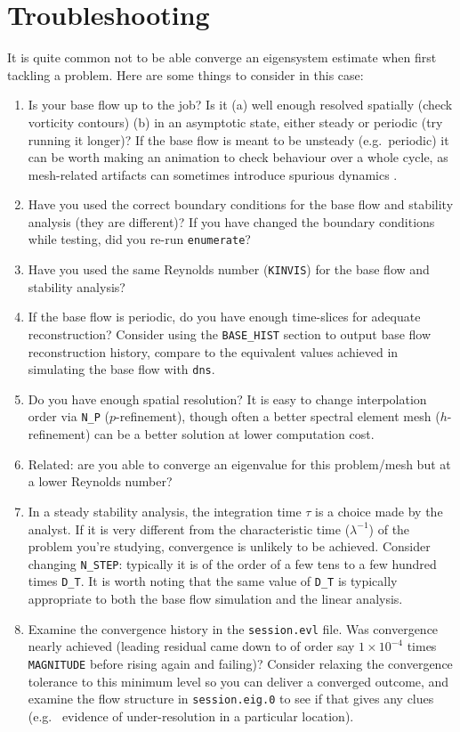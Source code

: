 \documentclass[11pt,a4paper]{report}
\newcommand{\eg}{e.g.\ }
\begin{document}
\chapter{Troubleshooting}

It is quite common not to be able converge an eigensystem estimate
when first tackling a problem.  Here are some things to consider in
this case:

\begin{enumerate}
\item
Is your base flow up to the job?  Is it (a) well enough resolved
spatially (check vorticity contours) (b) in an asymptotic state,
either steady or periodic (try running it longer)? If the base flow is
meant to be unsteady (\eg periodic) it can be worth making an
animation to check behaviour over a whole cycle, as mesh-related
artifacts can sometimes introduce spurious dynamics \citep[see \eg
  \S\,4.1 of][]{bbs08b}.
\item
Have you used the correct boundary conditions for the base flow and
stability analysis (they are different)?  If you have changed the
boundary conditions while testing, did you re-run \texttt{enumerate}?
\item
Have you used the same Reynolds number (\verb+KINVIS+) for the base
flow and stability analysis?
\item
If the base flow is periodic, do you have enough time-slices for
adequate reconstruction?  Consider using the \verb+BASE_HIST+ section
to output base flow reconstruction history, compare to the equivalent
values achieved in simulating the base flow with \verb+dns+.
\item
Do you have enough spatial resolution? It is easy to change
interpolation order via \verb+N_P+ ($p$-refinement), though often a
better spectral element mesh ($h$-refinement) can be a better solution
at lower computation cost.
\item
Related: are you able to converge an eigenvalue for this problem/mesh
but at a lower Reynolds number?
\item
In a steady stability analysis, the integration time $\tau$ is a
choice made by the analyst.  If it is very different from the
characteristic time ($\lambda^{-1}$) of the problem you're studying,
convergence is unlikely to be achieved.  Consider changing
\verb+N_STEP+: typically it is of the order of a few tens to a few
hundred times \verb+D_T+. It is worth noting that the same value of
\verb+D_T+ is typically appropriate to both the base flow simulation
and the linear analysis.
\item
Examine the convergence history in the \verb+session.evl+ file.  Was
convergence nearly achieved (leading residual came down to of order
say $1\times10^{-4}$ times \verb+MAGNITUDE+ before rising again and
failing)?  Consider relaxing the convergence tolerance to this minimum
level so you can deliver a converged outcome, and examine the flow
structure in \verb+session.eig.0+ to see if that gives any clues (\eg
evidence of under-resolution in a particular location).
\end{enumerate}




 

\end{document}
